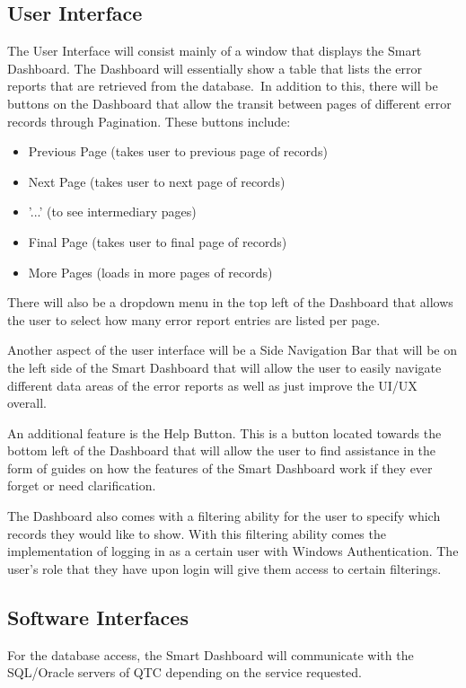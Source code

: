 \documentclass[12pt]{article}
\begin{document}
\subsection{User Interface}
The User Interface will consist mainly of a window that displays the Smart Dashboard. The Dashboard will essentially show a table that lists the error reports that are retrieved from the database.\
In addition to this, there will be buttons on the Dashboard that allow the transit between pages of different error records through Pagination. These buttons include:
\begin{itemize}
    \item Previous Page (takes user to previous page of records)
    \item Next Page (takes user to next page of records)
    \item '...' (to see intermediary pages)
    \item Final Page (takes user to final page of records)
    \item More Pages (loads in more pages of records)
\end{itemize}
There will also be a dropdown menu in the top left of the Dashboard that allows the user to select how many error report entries are listed per page.\

Another aspect of the user interface will be a Side Navigation Bar that will be on the left side of the Smart Dashboard that will allow the user to easily navigate different data areas of the error reports as well as just improve the UI/UX overall.\

An additional feature is the Help Button. This is a button located towards the bottom left of the Dashboard that will allow the user to find assistance in the form of guides on how the features of the Smart Dashboard work if they ever forget or need clarification.\

The Dashboard also comes with a filtering ability for the user to specify which records they would like to show. With this filtering ability comes the implementation of logging in as a certain user with Windows Authentication. The user's role that they have upon login will give them access to certain filterings.

\subsection{Software Interfaces}
For the database access, the Smart Dashboard will communicate with the SQL/Oracle servers of QTC depending on the service requested.
\end{document}
